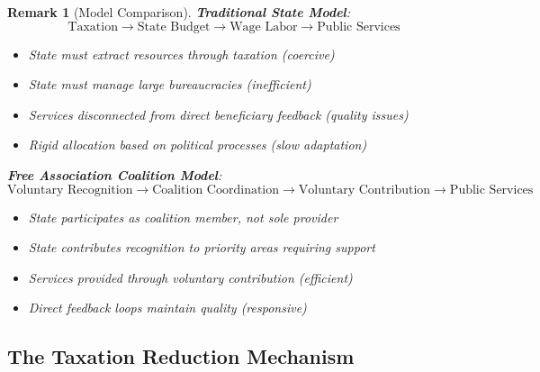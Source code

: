 \documentclass[11pt]{article}
\newtheorem{remark}{Remark}
\begin{document}
\begin{remark}[Model Comparison]
\textbf{Traditional State Model}:
\[
\text{Taxation} \to \text{State Budget} \to \text{Wage Labor} \to \text{Public Services}
\]
\begin{itemize}
\item State must extract resources through taxation (coercive)
\item State must manage large bureaucracies (inefficient)
\item Services disconnected from direct beneficiary feedback (quality issues)
\item Rigid allocation based on political processes (slow adaptation)
\end{itemize}

\textbf{Free Association Coalition Model}:
\[
\text{Voluntary Recognition} \to \text{Coalition Coordination} \to \text{Voluntary Contribution} \to \text{Public Services}
\]
\begin{itemize}
\item State participates as coalition member, not sole provider
\item State contributes recognition to priority areas requiring support
\item Services provided through voluntary contribution (efficient)
\item Direct feedback loops maintain quality (responsive)
\end{itemize}
\end{remark}

\subsection{The Taxation Reduction Mechanism}
\end{document}
